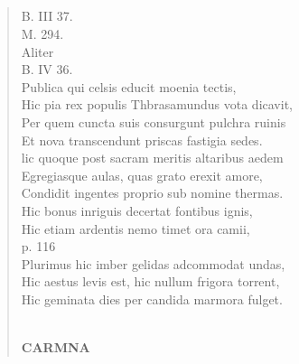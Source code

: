 \documentclass[11pt, a4paper]{report}
\begin{document}
            \subsection*{}
      \begin{verse}
      B. III 37. \\ M. 294. \\ Aliter \\ B. IV 36. \\ Publica qui celsis educit moenia tectis, \\ Hic pia rex populis Thbrasamundus vota dicavit, \\ Per quem cuncta suis consurgunt pulchra ruinis \\ Et nova transcendunt priscas fastigia sedes. \\ lic quoque post sacram meritis altaribus aedem \\ Egregiasque aulas, quas grato erexit amore, \\ Condidit ingentes proprio sub nomine thermas. \\ Hic bonus inriguis decertat fontibus ignis, \\ Hic etiam ardentis  \lbrack nemo timet ora camii, \\ p. 116 \\ Plurimus hic imber gelidas adcommodat undas, \\ Hic aestus levis est, hic nullum frigora torrent, \\ Hic geminata dies per candida marmora fulget. \\ 
        ﻿\pagebreak 
     \marginpar{[182]} \begin{center} \textbf{CARMNA} \end{center}
      \end{verse}
  
\end{document}
